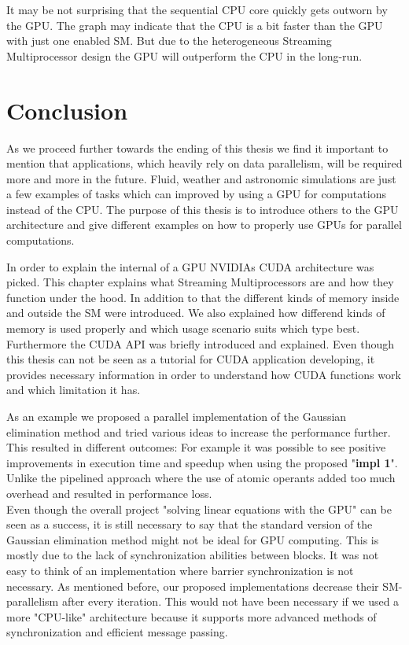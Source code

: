 \documentclass[draft, final]{vutinfth} %
\begin{document}
			It may be not surprising that the sequential CPU core quickly gets outworn by the GPU. The graph may indicate that the CPU is a bit faster than the GPU with just one enabled SM. But due to the heterogeneous Streaming Multiprocessor design the GPU will outperform the CPU in the long-run.

\chapter{Conclusion}
	As we proceed further towards the ending of this thesis we find it important to mention that applications, which heavily rely on data parallelism, will be required more and more in the future. Fluid, weather and astronomic simulations are just a few examples of tasks which can improved by using a GPU for computations instead of the CPU. The purpose of this thesis is to introduce others to the GPU architecture and give different examples on how to properly use GPUs for parallel computations.

	In order to explain the internal of a GPU NVIDIAs CUDA architecture was picked. This chapter explains what Streaming Multiprocessors are and how they function under the hood. In addition to that the different kinds of memory inside and outside the SM were introduced. We also explained how differend kinds of memory is used properly and which usage scenario suits which type best.\\
	Furthermore the CUDA API was briefly introduced and explained. Even though this thesis can not be seen as a tutorial for CUDA application developing, it provides necessary information in order to understand how CUDA functions work and which limitation it has.

	As an example we proposed a parallel implementation of the Gaussian elimination method and tried various ideas to increase the performance further. This resulted in different outcomes: For example it was possible to see positive improvements in execution time and speedup when using the proposed "\textbf{impl 1}". Unlike the pipelined approach where the use of atomic operants added too much overhead and resulted in performance loss.\\
	Even though the overall project "solving linear equations with the GPU" can be seen as a success, it is still necessary to say that the standard version of the Gaussian elimination method might not be ideal for GPU computing. This is mostly due to the lack of synchronization abilities between blocks. It was not easy to think of an implementation where barrier synchronization is not necessary. As mentioned before, our proposed implementations decrease their SM-parallelism after every iteration. This would not have been necessary if we used a more "CPU-like" architecture because it supports more advanced methods of synchronization and efficient message passing.
\end{document}
